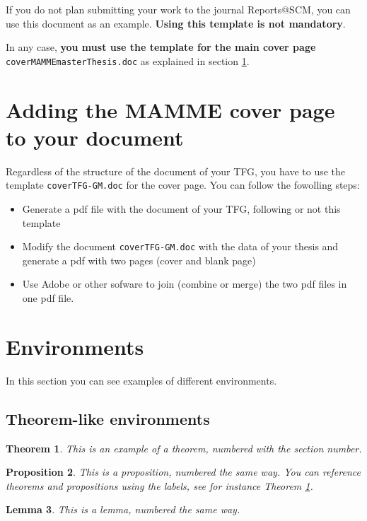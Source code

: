 \documentclass[12,twoside]{TFG-GM}
\newtheorem{theorem}{Theorem}[section]
\newtheorem{proposition}[theorem]{Proposition}
\newtheorem{lemma}[theorem]{Lemma}
\theoremstyle{definition}
\theoremstyle{remark}
\begin{document}
If you do not plan submitting your work to the journal  Reports@SCM, you can use this document as an example. \textbf{Using this template is not mandatory}.
 
In any case, \textbf{you must use the template for the main cover page} \texttt{coverMAMMEmasterThesis.doc} as explained in section \ref{sec:coverPage}.


\section{Adding the MAMME cover page to your document}
\label{sec:coverPage}
  
Regardless of the structure of the document of your TFG, you have to use the template \texttt{coverTFG-GM.doc} for the cover page. You can follow the fowolling steps:
\begin{itemize}
	\item Generate a pdf file with the document of your TFG, following or not this template
	\item Modify the document \texttt{coverTFG-GM.doc} with the data of your thesis and generate a pdf with two pages (cover and blank page)
	\item Use Adobe or other sofware to join (combine or merge) the two pdf files in one pdf file. 
\end{itemize}
 
\section{Environments}

In this section you can see examples of different environments.

\subsection{Theorem-like environments}

\begin{theorem} \label{th:example}
This is an example of a theorem, numbered with the section number.
\end{theorem}

\begin{proposition}
This is a proposition, numbered the same way. You can reference theorems and propositions using the labels, see for instance Theorem \ref{th:example}.
\end{proposition}

\begin{lemma}
This is a lemma, numbered the same way.
\end{lemma}
\end{document}
